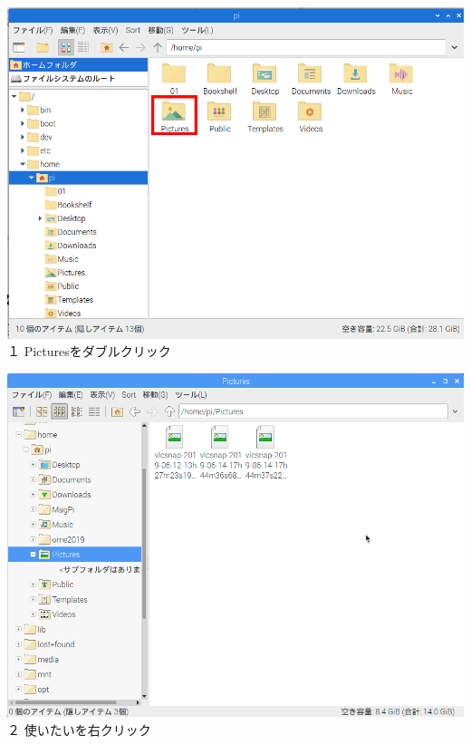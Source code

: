 \documentclass[a4paper,12pt]{jarticle}
\begin{document}
\begin{minipage}{0.45\linewidth}
  \includegraphics[width=\linewidth]{textbook-img164.png}
  \newline
  １ Picturesをダブルクリック
\end{minipage}
\hspace{10mm}
\begin{minipage}{0.45\linewidth}
  \includegraphics[width=\linewidth]{textbook-img162.png}
  \newline
  ２ 使いたいを右クリック
\end{minipage}

\bigskip
\end{document}
